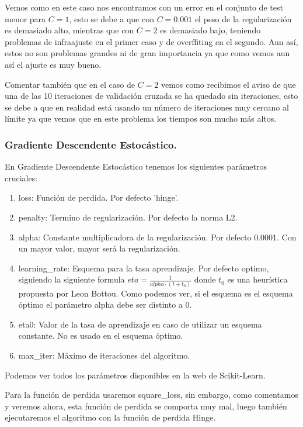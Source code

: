\documentclass[12pt, spanish]{article}
\begin{document}
Vemos como en este caso nos encontramos con un error en el conjunto de test menor para $C=1$, esto se debe a que con $C=0.001$ el peso de la regularización es demasiado alto, mientras que con $C=2$ es demasiado bajo, teniendo problemas de infraajuste en el primer caso y de overffiting en el segundo. Aun así, estos no son problemas grandes ni de gran importancia ya que como vemos aun así el ajuste es muy bueno.

Comentar también que en el caso de $C=2$ vemos como recibimos el aviso de que una de las 10 iteraciones de validación cruzada se ha quedado sin iteraciones, esto se debe a que en realidad está usando un número de iteraciones muy cercano al límite ya que vemos que en este problema los tiempos son mucho más altos.

\newpage

\subsubsection{Gradiente Descendente Estocástico.}

En Gradiente Descendente Estocástico tenemos los siguientes parámetros cruciales:

\begin{enumerate}
	\item loss: Función de perdida. Por defecto 'hinge'.
	\item penalty: Termino de regularización. Por defecto la norma L2.
	\item alpha: Constante multiplicadora de la regularización. Por defecto 0.0001. Con un mayor valor, mayor será la regularización.
	\item learning\_rate: Esquema para la tasa aprendizaje. Por defecto optimo, siguiendo la siguiente formula $eta = \frac{1}{alpha \cdot (t + t_0)}$ donde $t_0$ es una heurística propuesta por Leon Bottou. Como podemos ver, si el esquema es el esquema óptimo el parámetro alpha debe ser distinto a 0.
	\item eta0: Valor de la tasa de aprendizaje en caso de utilizar un esquema constante. No es usado en el esquema óptimo.
	\item max\_iter: Máximo de iteraciones del algoritmo.
\end{enumerate}

Podemos ver todos los parámetros disponibles en la web de Scikit-Learn\cite{sgdclasificacion}.

Para la función de perdida usaremos square\_loss, sin embargo, como comentamos y veremos ahora, esta función de perdida se comporta muy mal, luego también ejecutaremos el algoritmo con la función de perdida Hinge.
\end{document}
